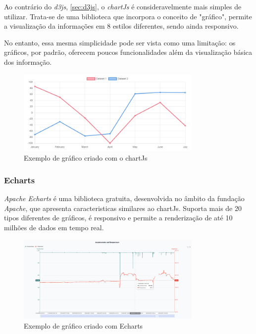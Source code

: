Ao contrário do \textit{d3js}, \ref{sec:d3js}, o \textit{chartJs} é consideravelmente mais simples de utilizar. Trata-se de uma biblioteca que incorpora o conceito  de "gráfico", permite a visualização da informações em 8 estilos diferentes, sendo ainda responsivo. 

No entanto, essa mesma simplicidade pode ser vista como uma limitação: os gráficos, por padrão, oferecem poucos funcionalidades além da visualização básica dos informação.

\begin{figure}[h!]
    \centering
    \includegraphics[width=0.8\textwidth]{figs/chartJs.png}
    \caption[Gráfico chartJs]{Exemplo de gráfico criado com o chartJs}
    \label{fig:chartjs}
\end{figure}

\subsubsection{\textbf{Echarts}}\label{sec:echarts}
\textit{Apache Echarts} é uma biblioteca gratuita, desenvolvida no âmbito da fundação \textit{Apache}, que apresenta caracteristicas similares ao chartJs. Suporta mais de 20 tipos diferentes de gráficos, é responsivo e permite a renderização de até 10 milhões de dados em tempo real.

\begin{figure}[h!]
    \centering
    \includegraphics[width=0.8\textwidth]{figs/echarts.png}
    \caption[Gráfico Apache Echarts]{Exemplo de gráfico criado com Echarts}
    \label{fig:echarts}
\end{figure}


